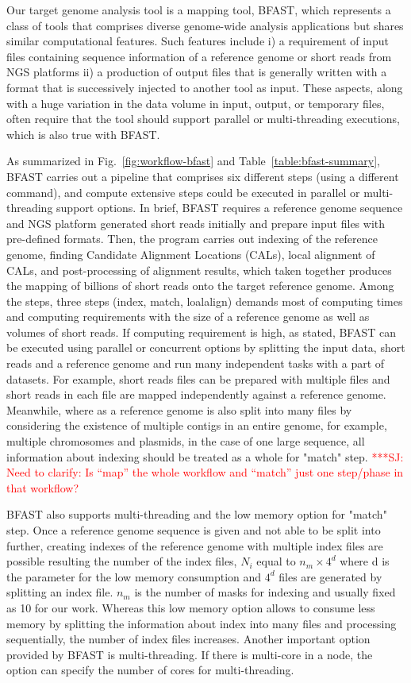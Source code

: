 \documentclass[12pt]{article}
\newcommand{\jhanote}[1]{ {\textcolor{red}     {***SJ: #1}}}
\newcommand{\jhanote}[1]{}
\begin{document}
Our target genome analysis tool is a mapping tool, BFAST\cite{bfast2009,bfast2009b}, which represents a class of tools that comprises diverse genome-wide analysis applications but shares similar computational features.  Such features include i) a requirement of input files containing sequence information of a reference genome or short reads from NGS platforms ii) a production of output files that is generally written with a format that is successively injected to another tool as input.  These aspects, along with a huge variation in the data volume in input, output, or temporary files, often require that the tool should support parallel or multi-threading executions, which is also true with BFAST\cite{bfast2009}.

As summarized in Fig.~\ref{fig:workflow-bfast} and Table~\ref{table:bfast-summary}, BFAST carries out a pipeline that comprises six different steps (using a different command), and compute extensive steps could be executed in parallel or multi-threading support options.  In brief, BFAST requires a reference genome sequence and NGS platform generated short reads initially and prepare input files with pre-defined formats.  Then, the program carries out indexing of the reference genome, finding Candidate Alignment Locations (CALs), local alignment of CALs, and post-processing of alignment results, which taken together produces the mapping of billions of short reads onto the target reference genome.  Among the steps, three steps (index, match, loalalign) demands most of computing times and computing requirements with the size of a reference genome as well as volumes of short reads.  If computing requirement is high, as stated, BFAST can be executed using parallel or concurrent options by splitting the input data, short reads and a reference genome and run many independent tasks with a part of datasets.  For example, short reads files can be prepared with multiple files and short reads in each file are mapped independently against a reference genome.  Meanwhile, where as a reference genome is also split into many files by considering the existence of multiple contigs in an entire genome, for example, multiple chromosomes and plasmids, in the case of one large sequence, all information about indexing should be treated as a whole for "match" step.  \jhanote{Need to clarify: Is ``map'' the whole workflow and ``match'' just one step/phase in that workflow?}


BFAST also supports multi-threading and the low memory option for "match" step. Once a reference genome sequence is given and not able to be split into further, creating indexes of the reference genome with multiple index files are possible resulting the number of the index files, $N_i$ equal to $n_m \times 4^d$ where d is the parameter for the low memory consumption and $4^d$ files are generated by splitting an index file.  $n_m$ is the number of masks for indexing and usually fixed as 10 for our work.  Whereas this low memory option allows to consume less memory by splitting the information about index into many files and processing sequentially, the number of index files increases.  Another important option provided by BFAST is multi-threading.  If there is multi-core in a node, the option can specify the number of cores for multi-threading.    
\end{document}
